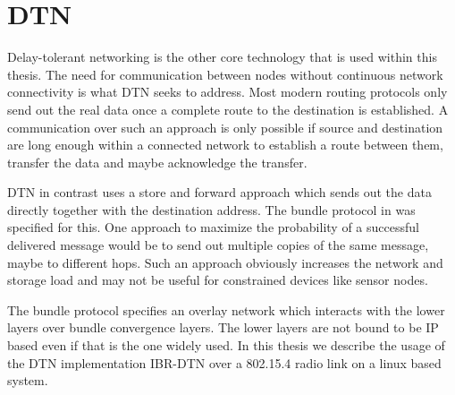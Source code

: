 \section{DTN}
\label{introdtn}
Delay-tolerant networking is the other core technology that is used within this
thesis. The need for communication between nodes without continuous network
connectivity is what DTN seeks to address. Most modern routing protocols only
send out the real data once a complete route to the destination is established.
A communication over such an approach is only possible if source and destination
are long enough within a connected network to establish a route between them,
transfer the data and maybe acknowledge the transfer.

DTN in contrast uses a store and forward approach which sends out the data
directly together with the destination address. The bundle protocol in
\cite{RFC5050} was specified for this. One approach to maximize the probability
of a successful delivered message would be to send out multiple copies of the
same message, maybe to different hops. Such an approach obviously increases the
network and storage load and may not be useful for constrained devices like
sensor nodes.

The bundle protocol specifies an overlay network which interacts with the lower
layers over bundle convergence layers. The lower layers are not bound to be IP
based even if that is the one widely used. In this thesis we describe the usage
of the DTN implementation IBR-DTN over a 802.15.4 radio link on a linux based
system.
